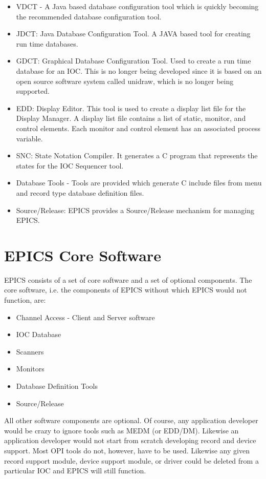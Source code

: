 \begin{itemize}\item VDCT - A Java based database configuration tool which is quickly becoming the recommended database 
configuration tool.

\item JDCT: Java Database Configuration Tool. A JAVA based tool for creating run time databases.

\item GDCT: Graphical Database Configuration Tool. Used to create a run time database for an IOC. This is no longer 
being developed since it is based on an open source software system called unidraw, which is no longer being 
supported.

\item EDD:  Display Editor. This tool is used to create a display list file for the Display Manager. A display list file 
contains a list of static, monitor, and control elements. Each monitor and control element has an associated process 
variable.

\item SNC:  State Notation Compiler. It generates a C program that represents the states for the IOC Sequencer tool.

\item Database Tools - Tools are provided which generate C include files from menu and record type database definition 
files.

\item Source/Release:  EPICS provides a Source/Release mechanism for managing EPICS.

\end{itemize}\section{EPICS Core Software}

EPICS consists of a set of core software and a set of optional components. The core software, i.e. the components of 
EPICS without which EPICS would not function, are:

\begin{itemize}\item Channel Access - Client and Server software

\item IOC Database

\item Scanners

\item Monitors

\item Database Definition Tools

\item Source/Release

\end{itemize}All other software components are optional. Of course, any application developer would be crazy to ignore tools such as 
MEDM (or EDD/DM). Likewise an application developer would not start from scratch developing record and device 
support. Most OPI tools do not, however, have to be used. Likewise any given record support module, device support 
module, or driver could be deleted from a particular IOC and EPICS will still function.


